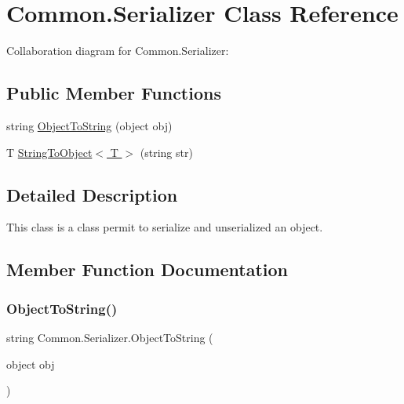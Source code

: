 \hypertarget{class_common_1_1_serializer}{}\section{Common.\+Serializer Class Reference}
\label{class_common_1_1_serializer}


Collaboration diagram for Common.\+Serializer\+:
\subsection*{Public Member Functions}
\begin{DoxyCompactItemize}
\item 
string \hyperlink{class_common_1_1_serializer_a7c344da0a494f22df46b4d8bcfa2c3a3}{Object\+To\+String} (object obj)
\item 
T \hyperlink{class_common_1_1_serializer_a639df2c61bf2912b65c66a6c1f9e96dc}{String\+To\+Object$<$ T $>$} (string str)
\end{DoxyCompactItemize}


\subsection{Detailed Description}
This class is a class permit to serialize and unserialized an object. 

\subsection{Member Function Documentation}
\mbox{\label{class_common_1_1_serializer_a7c344da0a494f22df46b4d8bcfa2c3a3}} 
\subsubsection{\texorpdfstring{Object\+To\+String()}{ObjectToString()}}
{\footnotesize\ttfamily string Common.\+Serializer.\+Object\+To\+String (\begin{DoxyParamCaption}\item[{object}]{obj }\end{DoxyParamCaption})\hspace{0.3cm}{\ttfamily [inline]}}

